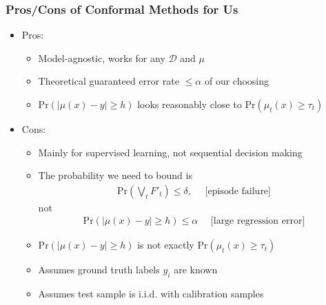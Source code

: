 \documentclass[handout]{beamer}
\begin{document}
\begin{frame}
    \frametitle{Pros/Cons of Conformal Methods for Us}
    \begin{itemize}
    \item Pros:
        \begin{itemize}
        \item Model-agnostic, works for any $\mathcal{D}$ and $\mu$
        \item Theoretical guaranteed error rate $\leq \alpha$ of our choosing
        \item $\text{Pr}(|\mu(x) - y| \geq h)$ looks reasonably close to $\text{Pr}(\mu_t(x) \geq \tau_t)$
        \end{itemize}
    \item Cons:
        \begin{itemize}
        \item Mainly for supervised learning, not sequential decision making
        \item The probability we need to bound is
            \begin{align*}
            \text{Pr}(\bigvee_t F'_t) \leq \delta, \quad \text{ [episode failure] }
            \end{align*}
            not
            \begin{align*}
            \text{Pr}(|\mu(x) - y| \geq h) \leq \alpha \quad \text{ [large regression error] }
            \end{align*}
        \item $\text{Pr}(|\mu(x) - y| \geq h)$ is not exactly $\text{Pr}(\mu_t(x) \geq \tau_t)$
        \item Assumes ground truth labels $y_i$ are known
        \item Assumes test sample is i.i.d. with calibration samples
        \end{itemize}
    \end{itemize}
\end{frame}
\end{document}
